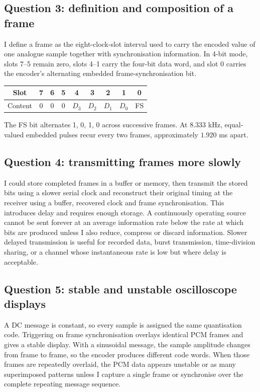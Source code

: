 \documentclass[11pt,a4paper]{article}
\begin{document}
\subsection{Question 3: definition and composition of a frame}
\begin{answerbox}
I define a frame as the eight-clock-slot interval used to carry the encoded value of one analogue sample together with synchronisation information. In 4-bit mode, slots 7--5 remain zero, slots 4--1 carry the four-bit data word, and slot 0 carries the encoder's alternating embedded frame-synchronisation bit.

\begin{center}
\begin{tabular}{c|c|c|c|c|c|c|c|c}
\toprule
Slot & 7 & 6 & 5 & 4 & 3 & 2 & 1 & 0 \\
\midrule
Content & 0 & 0 & 0 & $D_3$ & $D_2$ & $D_1$ & $D_0$ & FS \\
\bottomrule
\end{tabular}
\end{center}
The FS bit alternates 1, 0, 1, 0 across successive frames. At 8.333 kHz, equal-valued embedded pulses recur every two frames, approximately $1.920$ ms apart.
\end{answerbox}

\subsection{Question 4: transmitting frames more slowly}
\begin{answerbox}
I could store completed frames in a buffer or memory, then transmit the stored bits using a slower serial clock and reconstruct their original timing at the receiver using a buffer, recovered clock and frame synchronisation. This introduces delay and requires enough storage. A continuously operating source cannot be sent forever at an average information rate below the rate at which bits are produced unless I also reduce, compress or discard information. Slower delayed transmission is useful for recorded data, burst transmission, time-division sharing, or a channel whose instantaneous rate is low but where delay is acceptable.
\end{answerbox}

\subsection{Question 5: stable and unstable oscilloscope displays}
\begin{answerbox}
A DC message is constant, so every sample is assigned the same quantisation code. Triggering on frame synchronisation overlays identical PCM frames and gives a stable display. With a sinusoidal message, the sample amplitude changes from frame to frame, so the encoder produces different code words. When those frames are repeatedly overlaid, the PCM data appears unstable or as many superimposed patterns unless I capture a single frame or synchronise over the complete repeating message sequence.
\end{answerbox}
\end{document}
